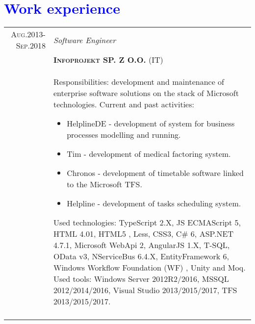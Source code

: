 \documentclass[a4paper,12pt]{article}
\begin{document}
\section{\textcolor{Blue}{Work experience}}
\begin{tabular}{r|p{12cm}}
\textsc{Aug.2013-Sep.2018}
	&\emph{Software Engineer} \\
	&\textsc{\textbf{Infoprojekt SP. Z O.O.}} (IT) \\
	&\footnotesize{
		Responsibilities: development and maintenance of enterprise software solutions on the stack of Microsoft technologies. \newline
		Current and past activities:
		\begin{itemize}
			\item HelplineDE - development of system for business processes modelling and running.
			\item Tim -  development of medical factoring system.
		    \item Chronos - development of timetable software linked to the Microsoft TFS.
			\item Helpline - development of tasks scheduling system.
		\end{itemize}
		Used technologies: \newline
		TypeScript 2.X, JS ECMAScript 5, HTML 4.01, HTML5 , Less, CSS3, C\# 6, ASP.NET 4.7.1, Microsoft WebApi 2, AngularJS 1.X, T-SQL,
		OData v3, NServiceBus 6.4.X, EntityFramework 6, Windows Workflow Foundation (WF) , Unity and Moq. \newline
		Used tools: \newline
		Windows Server 2012R2/2016, MSSQL 2012/2014/2016, Visual Studio 2013/2015/2017, TFS 2013/2015/2017.
	}\\
	\multicolumn{2}{c}{}\\


\end{tabular}
\end{document}
